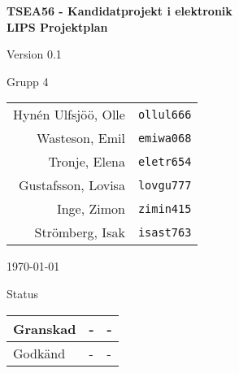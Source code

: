 \documentclass[11pt]{article}
\begin{document}
\begin{titlepage}
\begin{center}

{\Large\bfseries TSEA56 - Kandidatprojekt i elektronik \\ LIPS Projektplan}

\vspace{5em}

Version 0.1

\vspace{5em}
%
Grupp 4 \\
\begin{tabular}{rl}
Hynén Ulfsjöö, Olle&\verb+ollul666+
\\
Wasteson, Emil&\verb+emiwa068+
\\
Tronje, Elena&\verb+eletr654+
\\
Gustafsson, Lovisa&\verb+lovgu777+
\\
Inge, Zimon&\verb+zimin415+
\\
Strömberg, Isak&\verb+isast763+
\\
\end{tabular}

\vspace{5em}
\today

\vspace{16em}
Status
\begin{longtable}{|l|l|l|} \hline

Granskad & - & - \\ \hline
Godkänd & - & - \\ \hline
 
\end{longtable}

\end{center}
\end{titlepage}
\end{document}
